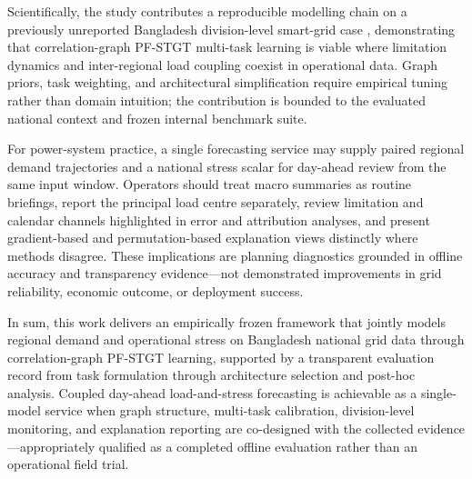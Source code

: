Scientifically, the study contributes a reproducible modelling chain on a previously unreported Bangladesh division-level smart-grid case \cite{Musbah2025LoadForecasting,Baur2024XAIReview}, demonstrating that correlation-graph PF-STGT multi-task learning is viable where limitation dynamics and inter-regional load coupling coexist in operational data. Graph priors, task weighting, and architectural simplification require empirical tuning rather than domain intuition; the contribution is bounded to the evaluated national context and frozen internal benchmark suite.

For power-system practice, a single forecasting service may supply paired regional demand trajectories and a national stress scalar for day-ahead review from the same input window. Operators should treat macro summaries as routine briefings, report the principal load centre separately, review limitation and calendar channels highlighted in error and attribution analyses, and present gradient-based and permutation-based explanation views distinctly where methods disagree. These implications are planning diagnostics grounded in offline accuracy and transparency evidence---not demonstrated improvements in grid reliability, economic outcome, or deployment success.

In sum, this work delivers an empirically frozen framework that jointly models regional demand and operational stress on Bangladesh national grid data through correlation-graph PF-STGT learning, supported by a transparent evaluation record from task formulation through architecture selection and post-hoc analysis. Coupled day-ahead load-and-stress forecasting is achievable as a single-model service when graph structure, multi-task calibration, division-level monitoring, and explanation reporting are co-designed with the collected evidence---appropriately qualified as a completed offline evaluation rather than an operational field trial.
